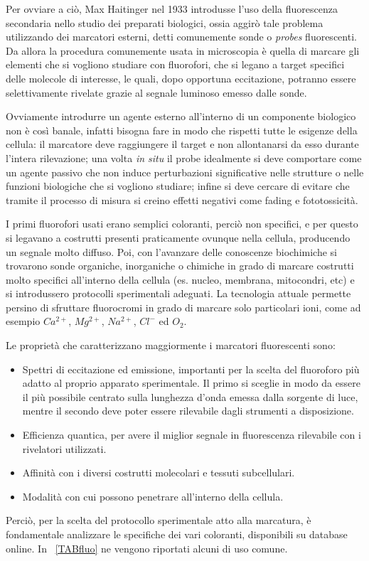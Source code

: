 Per ovviare a ciò, Max Haitinger nel 1933 introdusse l'uso della fluorescenza secondaria nello studio dei preparati biologici, ossia aggirò tale problema utilizzando dei marcatori esterni, detti comunemente sonde o \textit{probes} fluorescenti. 
Da allora la procedura comunemente usata in microscopia è quella di marcare gli elementi che si vogliono studiare con fluorofori, che si legano a target specifici delle molecole di interesse, le quali, dopo opportuna eccitazione, potranno essere selettivamente rivelate grazie al segnale luminoso emesso dalle sonde. 

Ovviamente introdurre un agente esterno all'interno di un componente biologico non è così banale, infatti bisogna fare in modo che rispetti tutte le esigenze della cellula: il marcatore deve raggiungere il target e non allontanarsi da esso durante l'intera rilevazione; una volta \textit{in situ} il probe idealmente si deve comportare come un agente passivo che non induce perturbazioni significative nelle strutture o nelle funzioni biologiche che si vogliono studiare; infine si deve cercare di evitare che tramite il processo di misura si creino effetti negativi come fading e fototossicità.

I primi fluorofori usati erano semplici coloranti, perciò non specifici, e per questo si legavano a costrutti presenti praticamente ovunque nella cellula, producendo un segnale molto diffuso. 
Poi, con l'avanzare delle conoscenze biochimiche si trovarono sonde organiche, inorganiche o chimiche in grado di marcare costrutti molto specifici all'interno della cellula (es. nucleo, membrana, mitocondri, etc) e si introdussero protocolli sperimentali adeguati. 
La tecnologia attuale permette persino di sfruttare fluorocromi in grado di marcare solo particolari ioni, come ad esempio $Ca^{2+}$, $Mg^{2+}$, $Na^{2+}$, $Cl^-$ ed $O_2$.

Le proprietà che caratterizzano maggiormente i marcatori fluorescenti sono:
\begin{itemize}
\item Spettri di eccitazione ed emissione, importanti per la scelta del fluoroforo più adatto al proprio apparato sperimentale. 
Il primo si sceglie in modo da essere il più possibile centrato sulla lunghezza d'onda emessa dalla sorgente di luce, mentre il secondo deve poter essere rilevabile dagli strumenti a disposizione. 
\item Efficienza quantica, per avere il miglior segnale in fluorescenza rilevabile con i rivelatori utilizzati. 
\item Affinità con i diversi costrutti molecolari e tessuti subcellulari.
\item Modalità con cui possono penetrare all'interno della cellula.
\end{itemize}
Perciò, per la scelta del protocollo sperimentale atto alla marcatura, è fondamentale analizzare le specifiche dei vari coloranti, disponibili su database online. 
In \tablename~\ref{TABfluo} ne vengono riportati alcuni di uso comune.

